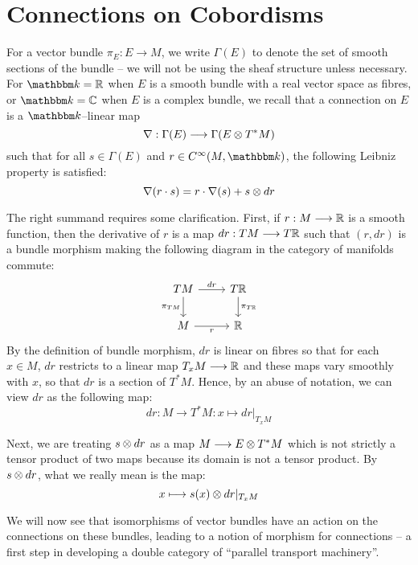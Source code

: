 \documentclass[./Thick_TQFTs_and_Quantum_Information.tex]{subfiles}
\begin{document}
\section{Connections on Cobordisms}

For a vector bundle $\pi_E : E \to M$, we write $\Gamma(E)$ to denote the set of
smooth sections of the bundle -- we will not be using the sheaf structure unless
necessary. For $\K = \R$ when $E$ is a smooth bundle with a real vector space as
fibres, or $\K = \C$ when $E$ is a complex bundle, we recall that a connection
\cite{Conn} on $E$ is a $\K$--linear map
\[
  \nabla : \Gamma(E) \stackrel{}{\longrightarrow} \Gamma(E \otimes T^*M)
\]
such that for all $s \in \Gamma(E)$ and $r \in \Cinf(M, \K)$, the following
Leibniz property is satisfied:
\[
  \nabla(r \cdot s) = r \cdot \nabla(s) + s \otimes dr
\]

The right summand requires some clarification.
First, if $r : M \stackrel{}{\longrightarrow} \mathbb{R}$ is a smooth function, then the derivative of $r$ is a
map $dr : TM \stackrel{}{\longrightarrow} T\mathbb{R}$ such that $(r, dr)$ is a bundle morphism making the
following diagram in the category of manifolds commute:
\[\begin{tikzcd}
TM \ar[d, "\pi_{TM}" left] \ar[r, "dr" above] & T\R \ar[d, "\pi_{T\R}" right]\\
M \ar[r, "r" below] & \R
\end{tikzcd}\]
By the definition of bundle morphism, $dr$ is linear on fibres so that for each
$x \in M$, $dr$ restricts to a linear map $T_xM \stackrel{}{\longrightarrow} \mathbb{R}$ and these maps vary
smoothly with $x$, so that $dr$ is a section of $T^*M$. Hence, by an abuse of
notation, we can view $dr$ as the following map:
\[
  dr : M \to T^*M : x \mapsto dr|_{T_xM}
\]

Next, we are treating $s \otimes dr$ as a map $M \stackrel{}{\longrightarrow} E \otimes T^*M$ which is
not strictly a tensor product of two maps because its domain is not a tensor
product. By $s \otimes dr$, what we really mean is the map:
\begin{equation}\label{eqn:conn_tensor}
  x \longmapsto s(x) \otimes dr|_{T_xM}
\end{equation}

We will now see that isomorphisms of vector bundles have an action on the
connections on these bundles, leading to a notion of morphism for connections --
a first step in developing a double category of
``parallel transport machinery''.






\end{document}
